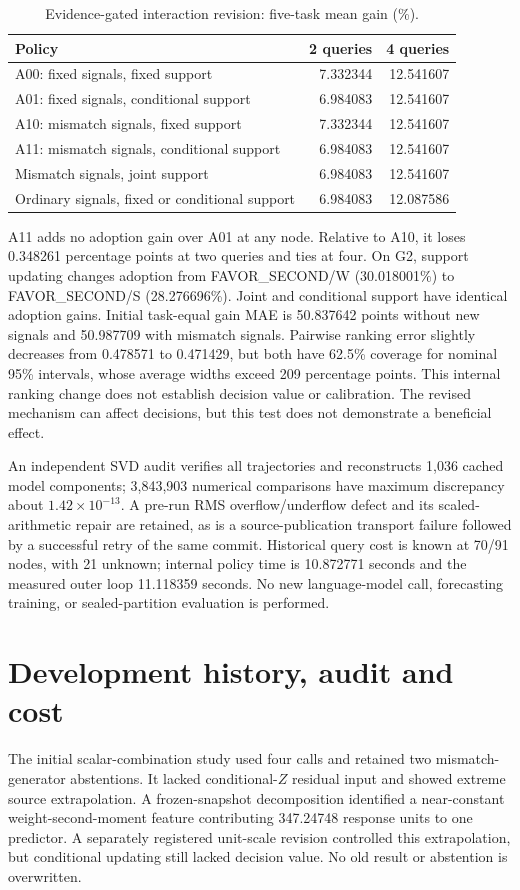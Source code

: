 \documentclass[10pt]{article}
\begin{document}
\begin{table}[ht]
\centering
\caption{Evidence-gated interaction revision: five-task mean gain (\%).}
\begin{tabular}{lrr}
\toprule
Policy & 2 queries & 4 queries\\
\midrule
A00: fixed signals, fixed support & 7.332344 & 12.541607\\
A01: fixed signals, conditional support & 6.984083 & 12.541607\\
A10: mismatch signals, fixed support & 7.332344 & 12.541607\\
A11: mismatch signals, conditional support & 6.984083 & 12.541607\\
Mismatch signals, joint support & 6.984083 & 12.541607\\
Ordinary signals, fixed or conditional support & 6.984083 & 12.087586\\
\bottomrule
\end{tabular}
\end{table}

A11 adds no adoption gain over A01 at any node.
Relative to A10, it loses 0.348261 percentage points at two queries and ties at four.
On G2, support updating changes adoption from FAVOR\_SECOND/W (30.018001\%) to FAVOR\_SECOND/S (28.276696\%).
Joint and conditional support have identical adoption gains.
Initial task-equal gain MAE is 50.837642 points without new signals and 50.987709 with mismatch signals.
Pairwise ranking error slightly decreases from 0.478571 to 0.471429, but both have 62.5\% coverage for nominal 95\% intervals, whose average widths exceed 209 percentage points.
This internal ranking change does not establish decision value or calibration.
The revised mechanism can affect decisions, but this test does not demonstrate a beneficial effect.

An independent SVD audit verifies all trajectories and reconstructs 1,036 cached model components; 3,843,903 numerical comparisons have maximum discrepancy about $1.42\times10^{-13}$.
A pre-run RMS overflow/underflow defect and its scaled-arithmetic repair are retained, as is a source-publication transport failure followed by a successful retry of the same commit.
Historical query cost is known at 70/91 nodes, with 21 unknown; internal policy time is 10.872771 seconds and the measured outer loop 11.118359 seconds.
No new language-model call, forecasting training, or sealed-partition evaluation is performed.

\section{Development history, audit and cost}
The initial scalar-combination study used four calls and retained two mismatch-generator abstentions.
It lacked conditional-$Z$ residual input and showed extreme source extrapolation.
A frozen-snapshot decomposition identified a near-constant weight-second-moment feature contributing 347.24748 response units to one predictor.
A separately registered unit-scale revision controlled this extrapolation, but conditional updating still lacked decision value.
No old result or abstention is overwritten.
\end{document}
